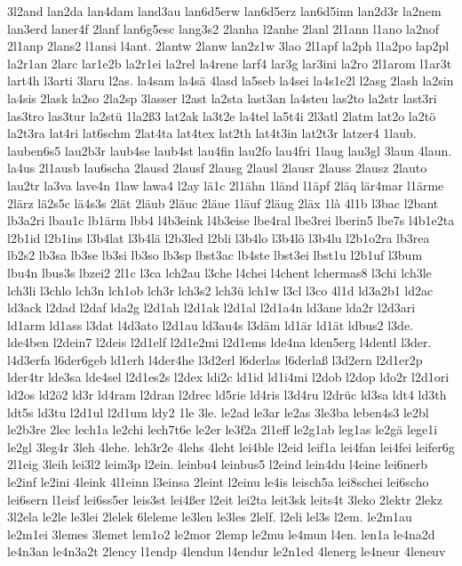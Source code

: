 {3l2and
lan2da
lan4dam
land3au
lan6d5erw
lan6d5erz
lan6d5inn
lan2d3r
la2nem
lan3erd
laner4f
2lanf
lan6g5esc
lang3s2
2lanha
l2anhe
2lanl
2l1ann
l1ano
la2nof
2l1anp
2lans2
l1ansi
l4ant.
2lantw
2lanw
lan2z1w
3lao
2l1apf
la2ph
l1a2po
lap2pl
la2r1an
2larc
lar1e2b
la2r1ei
la2rel
la4rene
larf4
lar3g
lar3ini
la2ro
2l1arom
l1ar3t
lart4h
l3arti
3laru
l2as.
la4sam
la4sä
4lasd
la5seb
la4sei
la4s1e2l
l2asg
2lash
la2sin
la4sis
2lask
la2so
2la2sp
3lasser
l2ast
la2sta
last3an
la4steu
las2to
la2str
last3ri
las3tro
las3tur
la2stü
1la2ß3
lat2ak
la3t2e
la4tel
la5t4i
2l3atl
2latm
lat2o
la2tö
la2t3ra
lat4ri
lat6schm
2lat4ta
lat4tex
lat2th
lat4t3in
lat2t3r
latzer4
1laub.
lauben6s5
lau2b3r
laub4se
laub4st
lau4fin
lau2fo
lau4fri
1laug
lau3gl
3laun
4laun.
la4us
2l1ausb
lau6scha
2lausd
2lausf
2lausg
2lausl
2lausr
2lauss
2lausz
2lauto
lau2tr
la3va
lave4n
1law
lawa4
l2ay
lä1c
2l1ähn
1länd
l1äpf
2läq
lär4mar
l1ärme
2lärz
lä2s5c
lä4s3s
2lät
2läub
2läuc
2läue
1läuf
2läug
2läx
1là
4l1b
l3bac
l2bant
lb3a2ri
lbau1c
lb1ärm
lbb4
l4b3eink
l4b3eise
lbe4ral
lbe3rei
lberin5
lbe7s
l4b1e2ta
l2b1id
l2b1ins
l3b4lat
l3b4lä
l2b3led
l2bli
l3b4lo
l3b4lö
l3b4lu
l2b1o2ra
lb3rea
lb2s2
lb3sa
lb3se
lb3si
lb3so
lb3sp
lbst3ac
lb4ste
lbst3ei
lbst1u
l2b1uf
l3bum
lbu4n
lbus3s
lbzei2
2l1c
l3ca
lch2au
l3che
l4chei
l4chent
lchermas8
l3chi
lch3le
lch3li
l3chlo
lch3n
lch1ob
lch3r
lch3s2
lch3ü
lch1w
l3cl
l3co
4l1d
ld3a2b1
ld2ac
ld3ack
l2dad
l2daf
lda2g
l2d1ah
l2d1ak
l2d1al
l2d1a4n
ld3ane
lda2r
l2d3ari
ld1arm
ld1ass
l3dat
l4d3ato
l2d1au
ld3au4s
l3däm
ld1är
ld1ät
ldbus2
l3de.
lde4ben
l2dein7
l2deis
l2d1elf
l2d1e2mi
l2d1ems
lde4na
lden5erg
l4dentl
l3der.
l4d3erfa
l6der6geb
ld1erh
l4der4he
l3d2erl
l6derlas
l6derlaß
l3d2ern
l2d1er2p
lder4tr
lde3sa
lde4sel
l2d1es2s
l2dex
ldi2c
ld1id
ld1i4mi
l2dob
l2dop
ldo2r
l2d1ori
ld2os
ld2ö2
ld3r
ld4ram
l2dran
l2drec
ld5rie
ld4ris
l3d4ru
l2drüc
ld3sa
ldt4
ld3th
ldt5s
ld3tu
l2d1ul
l2d1um
ldy2
1le
3le.
le2ad
le3ar
le2as
3le3ba
leben4s3
le2bl
le2b3re
2lec
lech1a
le2chi
lech7t6e
le2er
le3f2a
2l1eff
le2g1ab
leg1as
le2gä
lege1i
le2gl
3leg4r
3leh
4lehe.
leh3r2e
4lehs
4leht
lei4ble
l2eid
leif1a
lei4fan
lei4fei
leifer6g
2l1eig
3leih
lei3l2
leim3p
l2ein.
leinbu4
leinbus5
l2eind
lein4du
l4eine
lei6nerb
le2inf
le2ini
4leink
4l1einn
l3einsa
2leint
l2einu
le4is
leisch5a
lei8schei
lei6scho
lei6sern
l1eisf
lei6ss5er
leis3st
lei4ßer
l2eit
lei2ta
leit3sk
leits4t
3leko
2lektr
2lekz
3l2ela
le2le
le3lei
2lelek
6leleme
le3len
le3les
2lelf.
l2eli
lel3s
l2em.
le2m1au
le2m1ei
3lemes
3lemet
lem1o2
le2mor
2lemp
le2mu
le4mun
l4en.
len1a
le4na2d
le4n3an
le4n3a2t
2lency
l1endp
4lendun
l4endur
le2n1ed
4lenerg
le4neur
4leneuv
}
